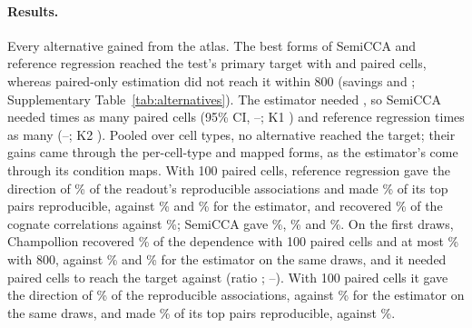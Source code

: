 \paragraph{Results.} Every alternative gained from the atlas. The best forms of SemiCCA and reference regression reached the test's primary target with \AltCellsSemi{} and \AltCellsRidge{} paired cells, whereas paired-only estimation did not reach it within 800 (savings \AltRatioPoOverSemi{} and \AltRatioPoOverRidge; Supplementary Table~\ref{tab:alternatives}). The estimator needed \AltCellsAtlas, so SemiCCA needed \AltRatioSemi{} times as many paired cells (95\% CI, \AltRatioSemiLo--\AltRatioSemiHi; K1 \AltKOne) and reference regression \AltRatioRidge{} times as many (\AltRatioRidgeLo--\AltRatioRidgeHi; K2 \AltKTwo). Pooled over cell types, no alternative reached the target; their gains came through the per-cell-type and mapped forms, as the estimator's come through its condition maps. With 100 paired cells, reference regression gave the direction of \AltOneRidgeHundred\% of the readout's reproducible associations and made \AltTwoRidgeHundred\% of its top pairs reproducible, against \AltOneAtlasHundred\% and \AltTwoAtlasHundred\% for the estimator, and recovered \AltThreeRidgeHundred\% of the cognate correlations against \AltThreeAtlasHundred\%; SemiCCA gave \AltOneSemiHundred\%, \AltTwoSemiHundred\% and \AltThreeSemiHundred\%. On the first draws, Champollion recovered \AltRfChampHundred\% of the dependence with 100 paired cells and at most \AltRfMaxChamp\% with 800, against \AltRfChampAtlasHundred\% and \AltRfMaxChampAtlas\% for the estimator on the same draws, and it needed \AltCellsChamp{} paired cells to reach the target against \AltCellsChampAtlas{} (ratio \AltRatioChamp; \AltRatioChampLo--\AltRatioChampHi). With 100 paired cells it gave the direction of \AltOneChampHundred\% of the reproducible associations, against \AltOneChampAtlasHundred\% for the estimator on the same draws, and made \AltTwoChampHundred\% of its top pairs reproducible, against \AltTwoChampAtlasHundred\%.

